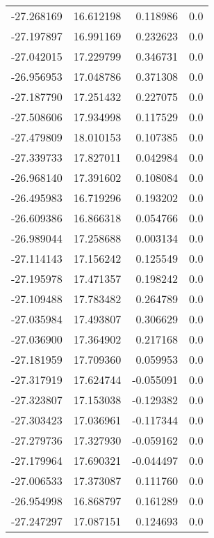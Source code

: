 \begin{tabular}{rrrr}
      -27.268169 &        16.612198 &    0.118986 &   0.0 \\
      -27.197897 &        16.991169 &    0.232623 &   0.0 \\
      -27.042015 &        17.229799 &    0.346731 &   0.0 \\
      -26.956953 &        17.048786 &    0.371308 &   0.0 \\
      -27.187790 &        17.251432 &    0.227075 &   0.0 \\
      -27.508606 &        17.934998 &    0.117529 &   0.0 \\
      -27.479809 &        18.010153 &    0.107385 &   0.0 \\
      -27.339733 &        17.827011 &    0.042984 &   0.0 \\
      -26.968140 &        17.391602 &    0.108084 &   0.0 \\
      -26.495983 &        16.719296 &    0.193202 &   0.0 \\
      -26.609386 &        16.866318 &    0.054766 &   0.0 \\
      -26.989044 &        17.258688 &    0.003134 &   0.0 \\
      -27.114143 &        17.156242 &    0.125549 &   0.0 \\
      -27.195978 &        17.471357 &    0.198242 &   0.0 \\
      -27.109488 &        17.783482 &    0.264789 &   0.0 \\
      -27.035984 &        17.493807 &    0.306629 &   0.0 \\
      -27.036900 &        17.364902 &    0.217168 &   0.0 \\
      -27.181959 &        17.709360 &    0.059953 &   0.0 \\
      -27.317919 &        17.624744 &   -0.055091 &   0.0 \\
      -27.323807 &        17.153038 &   -0.129382 &   0.0 \\
      -27.303423 &        17.036961 &   -0.117344 &   0.0 \\
      -27.279736 &        17.327930 &   -0.059162 &   0.0 \\
      -27.179964 &        17.690321 &   -0.044497 &   0.0 \\
      -27.006533 &        17.373087 &    0.111760 &   0.0 \\
      -26.954998 &        16.868797 &    0.161289 &   0.0 \\
      -27.247297 &        17.087151 &    0.124693 &   0.0 \\

\end{tabular}
